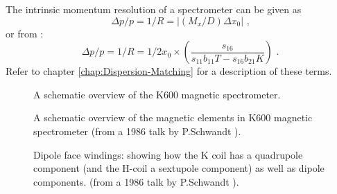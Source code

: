 \documentclass[11pt]{report}
\begin{document}
The intrinsic momentum resolution of a spectrometer can be given as \cite{Wak02}
\begin{equation} 
\Delta p/p = 1/R = \left|  (M_{x}/D)\Delta x_{0}  \right|   \textrm{   ,}
\end{equation} 
%
or from \cite{Fuj02}: 
%
\begin{equation} 
\Delta p/p = 1/R = 1/2x_{0}\times(\frac{s_{16}}{s_{11}b_{11}T-s_{16}b_{21}K   }) \textrm{   .}
\end{equation} 
%
Refer to chapter \ref{chap:Dispersion-Matching} for a description of these terms.




\begin{figure}[!ht]
\centerline{\vspace{0cm}\hspace{0cm}
}
\centering
\caption{A schematic overview of the K600 magnetic spectrometer.}
\label{fig:k600-fig}
\end{figure} 

\begin{figure}[!ht]
\centerline{\vspace{0cm}\hspace{0cm}
}
\centering
\caption{A schematic overview of the magnetic elements in K600 magnetic spectrometer (from a 1986 talk by P.Schwandt \cite{Sch86}). }
\label{fig:k600-fig-magneticelements}
\end{figure} 

\begin{figure}[!ht]
\centerline{\vspace{0cm}\hspace{0cm}
}
\centering
\caption{Dipole face windings: showing how the K coil has a quadrupole component (and the H-coil a sextupole component)
as well as dipole components. (from a 1986 talk by P.Schwandt \cite{Sch86}). }
\label{fig:k600-fig-magneticelements}
\end{figure} 
\end{document}
